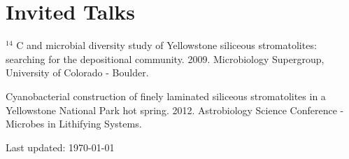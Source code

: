 \documentclass[letterpaper]{article}
\renewenvironment{itemize}{
  \begin{list}{}{
    \setlength{\leftmargin}{1.5em}
  }
}{
  \end{list}
}
\begin{document}
\section*{Invited Talks}
\begin{itemize}
    \item $^{14}$ C and microbial diversity study of Yellowstone siliceous
        stromatolites: searching for the depositional community.  2009.
        Microbiology Supergroup, University of Colorado - Boulder.
    \item Cyanobacterial construction of finely laminated siliceous
        stromatolites in a Yellowstone National Park hot spring. 2012.
        Astrobiology Science Conference - Microbes in Lithifying
        Systems.
\end{itemize}

%
\begin{center}
  \begin{footnotesize}
    Last updated: \today \\
  \end{footnotesize}
\end{center}
\end{document}

